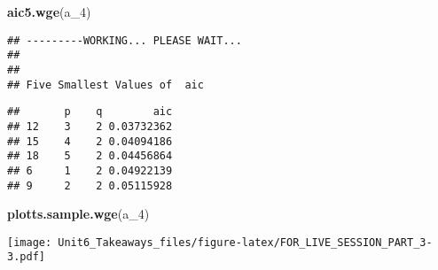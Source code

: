 \documentclass[
]{article}
\newenvironment{Shaded}{\begin{snugshade}}{\end{snugshade}}
\newcommand{\DecValTok}[1]{\textcolor[rgb]{0.00,0.00,0.81}{#1}}
\newcommand{\KeywordTok}[1]{\textcolor[rgb]{0.13,0.29,0.53}{\textbf{#1}}}
\newcommand{\NormalTok}[1]{#1}
\begin{document}
\begin{Shaded}
\begin{Highlighting}[]
\KeywordTok{aic5.wge}\NormalTok{(a_}\DecValTok{4}\NormalTok{)}
\end{Highlighting}
\end{Shaded}

\begin{verbatim}
## ---------WORKING... PLEASE WAIT... 
## 
## 
## Five Smallest Values of  aic
\end{verbatim}

\begin{verbatim}
##       p    q        aic
## 12    3    2 0.03732362
## 15    4    2 0.04094186
## 18    5    2 0.04456864
## 6     1    2 0.04922139
## 9     2    2 0.05115928
\end{verbatim}

\begin{Shaded}
\begin{Highlighting}[]
\KeywordTok{plotts.sample.wge}\NormalTok{(a_}\DecValTok{4}\NormalTok{)}
\end{Highlighting}
\end{Shaded}

\texttt{[image: Unit6\_Takeaways\_files/figure-latex/FOR\_LIVE\_SESSION\_PART\_3-3.pdf]}
\end{document}
